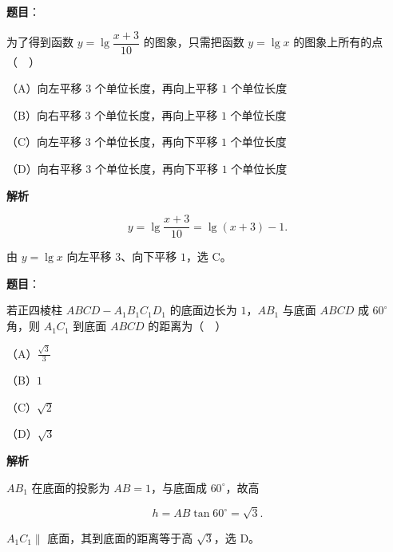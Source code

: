 \begin{answer}

\textbf{题目}：

为了得到函数 $y=\lg\dfrac{x+3}{10}$ 的图象，只需把函数 $y=\lg x$ 的图象上所有的点（　）

（A）向左平移 $3$ 个单位长度，再向上平移 $1$ 个单位长度

（B）向右平移 $3$ 个单位长度，再向上平移 $1$ 个单位长度

（C）向左平移 $3$ 个单位长度，再向下平移 $1$ 个单位长度

（D）向右平移 $3$ 个单位长度，再向下平移 $1$ 个单位长度

\textbf{解析}

\nopagebreak[4]
\[y=\lg\frac{x+3}{10}=\lg(x+3)-1 .\]

由 $y=\lg x$ 向左平移 $3$、向下平移 $1$，选 C。


\end{answer}
\begin{answer}

\textbf{题目}：

若正四棱柱 $ABCD-A_1B_1C_1D_1$ 的底面边长为 $1$，$AB_1$ 与底面 $ABCD$ 成 $60^\circ$ 角，则 $A_1C_1$ 到底面 $ABCD$ 的距离为（　）

（A）$\frac{\sqrt3}{3}$

（B）$1$

（C）$\sqrt2$

（D）$\sqrt3$

\textbf{解析}

$AB_1$ 在底面的投影为 $AB=1$，与底面成 $60^\circ$，故高

\nopagebreak[4]
\[h=AB\tan60^\circ=\sqrt3 .\]

$A_1C_1\parallel$ 底面，其到底面的距离等于高 $\sqrt3$，选 D。


\end{answer}
